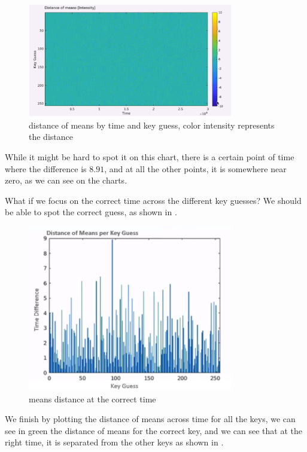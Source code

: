 \begin{figure}[!ht]
    \centering
    \includegraphics[width=0.8\textwidth]{images/Lecture6/intensity_represents_means_diff.png}
    \caption{distance of means by time and key guess, color intensity represents the distance} \label{fig:intensity_represents_means_diff}
\end{figure}

While it might be hard to spot it on this chart, there is a certain point of time where the difference is $8.91$, and at all the other points, it is somewhere near zero, as we can see on the charts.

What if we focus on the correct time across the different key guesses? We should be able to spot the correct guess, as shown in .

\begin{figure}[!ht]
    \centering
    \includegraphics[width=0.8\textwidth]{images/Lecture6/the-correct-time.png}
    \caption{means distance at the correct time} \label{fig:the-correct-time}
\end{figure}

We finish by plotting the distance of means across time for all the keys, we can see in green the distance of means for the correct key, and we can see that at the right time, it is separated from the other keys as shown in .

